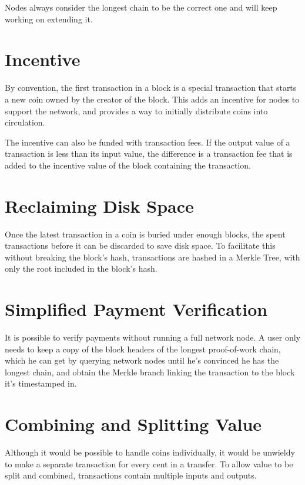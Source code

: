 \documentclass{article}
\begin{document}
Nodes always consider the longest chain to be the correct one and will keep working on extending it.

\section{Incentive}

By convention, the first transaction in a block is a special transaction that starts a new coin owned by the creator of the block. This adds an incentive for nodes to support the network, and provides a way to initially distribute coins into circulation.

The incentive can also be funded with transaction fees. If the output value of a transaction is less than its input value, the difference is a transaction fee that is added to the incentive value of the block containing the transaction.

\section{Reclaiming Disk Space}

Once the latest transaction in a coin is buried under enough blocks, the spent transactions before it can be discarded to save disk space. To facilitate this without breaking the block's hash, transactions are hashed in a Merkle Tree, with only the root included in the block's hash.

\section{Simplified Payment Verification}

It is possible to verify payments without running a full network node. A user only needs to keep a copy of the block headers of the longest proof-of-work chain, which he can get by querying network nodes until he's convinced he has the longest chain, and obtain the Merkle branch linking the transaction to the block it's timestamped in.

\section{Combining and Splitting Value}

Although it would be possible to handle coins individually, it would be unwieldy to make a separate transaction for every cent in a transfer. To allow value to be split and combined, transactions contain multiple inputs and outputs.
\end{document}
